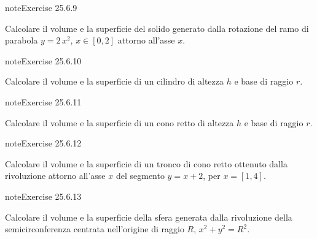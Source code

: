 \documentclass[letterpaper,10pt,italian]{jupyterBook}
\begin{document}
\begin{sphinxadmonition}{note}{Exercise 25.6.9}





\sphinxAtStartPar
Calcolare il volume e la superficie del solido generato dalla rotazione del ramo di parabola \(y = 2\, x^2\), \(x \in [0,2]\) attorno all’asse \(x\).
\end{sphinxadmonition}
 \label{exercise:ch/infinitesimal_calculus/integrals-problems-exercise-9}

\begin{sphinxadmonition}{note}{Exercise 25.6.10}





\sphinxAtStartPar
Calcolare il volume e la superficie di un cilindro di altezza \(h\) e base di raggio \(r\).
\end{sphinxadmonition}
 \label{exercise:ch/infinitesimal_calculus/integrals-problems-exercise-10}

\begin{sphinxadmonition}{note}{Exercise 25.6.11}





\sphinxAtStartPar
Calcolare il volume e la superficie di un cono retto di altezza \(h\) e base di raggio \(r\).
\end{sphinxadmonition}
 \label{exercise:ch/infinitesimal_calculus/integrals-problems-exercise-11}

\begin{sphinxadmonition}{note}{Exercise 25.6.12}





\sphinxAtStartPar
Calcolare il volume e la superficie di un tronco di cono retto ottenuto dalla rivoluzione attorno all’asse \(x\) del segmento \(y = x + 2\), per \(x = [1,4]\).
\end{sphinxadmonition}
 \label{exercise:ch/infinitesimal_calculus/integrals-problems-exercise-12}

\begin{sphinxadmonition}{note}{Exercise 25.6.13}





\sphinxAtStartPar
Calcolare il volume e la superficie della sfera generata dalla rivoluzione della semicirconferenza centrata nell’origine di raggio \(R\), \(x^2 + y^2 = R^2\).
\end{sphinxadmonition}
 \label{exercise:ch/infinitesimal_calculus/integrals-problems-exercise-13}
\end{document}
